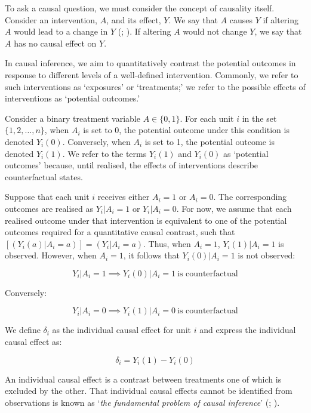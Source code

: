 \documentclass[
  single column]{article}
\begin{document}
To ask a causal question, we must consider the concept of causality
itself. Consider an intervention, \(A\), and its effect, \(Y\). We say
that \(A\) causes \(Y\) if altering \(A\) would lead to a change in
\(Y\) (;
). If altering \(A\) would not
change \(Y\), we say that \(A\) has no causal effect on \(Y\).

In causal inference, we aim to quantitatively contrast the potential
outcomes in response to different levels of a well-defined intervention.
Commonly, we refer to such interventions as `exposures' or `treatments;'
we refer to the possible effects of interventions as `potential
outcomes.'

Consider a binary treatment variable \(A \in \{0,1\}\). For each unit
\(i\) in the set \(\{1, 2, \ldots, n\}\), when \(A_i\) is set to 0, the
potential outcome under this condition is denoted \(Y_i(0)\).
Conversely, when \(A_i\) is set to 1, the potential outcome is denoted
\(Y_i(1)\). We refer to the terms \(Y_i(1)\) and \(Y_i(0)\) as
`potential outcomes' because, until realised, the effects of
interventions describe counterfactual states.

Suppose that each unit \(i\) receives either \(A_i = 1\) or \(A_i = 0\).
The corresponding outcomes are realised as \(Y_i|A_i = 1\) or
\(Y_i|A_i = 0\). For now, we assume that each realised outcome under
that intervention is equivalent to one of the potential outcomes
required for a quantitative causal contrast, such that
\([(Y_i(a)|A_i = a)] = (Y_i|A_i = a)\). Thus, when \(A_i = 1\),
\(Y_i(1)|A_i = 1\) is observed. However, when \(A_i = 1\), it follows
that \(Y_i(0)|A_i = 1\) is not observed:

\[
Y_i|A_i = 1 \implies Y_i(0)|A_i = 1~ \text{is counterfactual}
\]

Conversely:

\[
Y_i|A_i = 0 \implies Y_i(1)|A_i = 0~ \text{is counterfactual}
\]

We define \(\delta_i\) as the individual causal effect for unit \(i\)
and express the individual causal effect as:

\[
\delta_i = Y_i(1) - Y_i(0)
\]

An individual causal effect is a contrast between treatments one of
which is excluded by the other. That individual causal effects cannot be
identified from observations is known as `\emph{the fundamental problem
of causal inference}' (;
).
\end{document}
